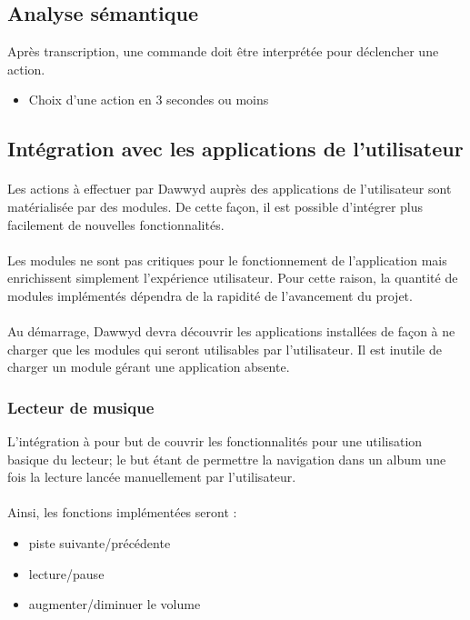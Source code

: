 \documentclass[12pt]{article}
\begin{document}
    \subsection{Analyse sémantique}
    Après transcription, une commande doit être interprétée pour déclencher une
    action.
    \begin{itemize}
        \item Choix d'une action en 3 secondes ou moins
    \end{itemize}

    \subsection{Intégration avec les applications de l'utilisateur}
    \paragraph{}
    Les actions à effectuer par Dawwyd auprès des applications de l'utilisateur
    sont matérialisée par des modules. De cette façon, il est possible
    d'intégrer plus facilement de nouvelles fonctionnalités.

    \paragraph{}
    Les modules ne sont pas critiques pour le fonctionnement de l'application
    mais enrichissent simplement l'expérience utilisateur. Pour
    cette raison, la quantité de modules implémentés dépendra de la rapidité
    de l'avancement du projet.

    \paragraph{}
    Au démarrage, Dawwyd devra découvrir les applications installées de façon à
    ne charger que les modules qui seront utilisables par l'utilisateur. Il est
    inutile de charger un module gérant une application absente.

    \subsubsection{Lecteur de musique}
    L'intégration à pour but de couvrir les fonctionnalités pour une utilisation
    basique du lecteur; le but étant de permettre la navigation dans un album
    une fois la lecture lancée manuellement par l'utilisateur.

    \paragraph{}
    Ainsi, les fonctions implémentées seront :
    \begin{itemize}
        \item piste suivante/précédente
        \item lecture/pause
        \item augmenter/diminuer le volume
    \end{itemize}
\end{document}
